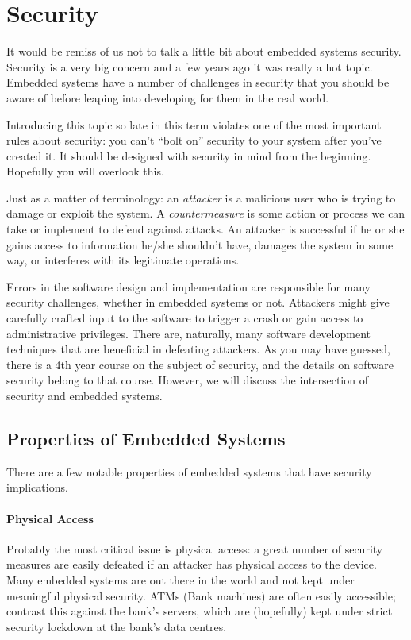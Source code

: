 




\section*{Security}
It would be remiss of us not to talk a little bit about embedded systems security. Security is a very big concern and a few years ago it was really a hot topic. Embedded systems have a number of challenges in security that you should be aware of before leaping into developing for them in the real world.

Introducing this topic so late in this term violates one of the most important rules about security: you can't ``bolt on'' security to your system after you've created it. It should be designed with security in mind from the beginning. Hopefully you will overlook this. 

Just as a matter of terminology: an \emph{attacker} is a malicious user who is trying to damage or exploit the system. A \emph{countermeasure} is some action or process we can take or implement to defend against attacks. An attacker is successful if he or she gains access to information he/she shouldn't have, damages the system in some way, or interferes with its legitimate operations.

Errors in the software design and implementation are responsible for many security challenges, whether in embedded systems or not. Attackers might give carefully crafted input to the software to trigger a crash or gain access to administrative privileges. There are, naturally, many software development techniques that are beneficial in defeating attackers. As you may have guessed, there is a 4th year course on the subject of security, and the details on software security belong to that course. However, we will discuss the intersection of security and embedded systems.

\subsection*{Properties of Embedded Systems}

There are a few notable properties of embedded systems that have security implications. 


\paragraph{Physical Access}
Probably the most critical issue is physical access: a great number of security measures are easily defeated if an attacker has physical access to the device. Many embedded systems are out there in the world and not kept under meaningful physical security. ATMs (Bank machines) are often easily accessible; contrast this against the bank's servers, which are (hopefully) kept under strict security lockdown at the bank's data centres.


